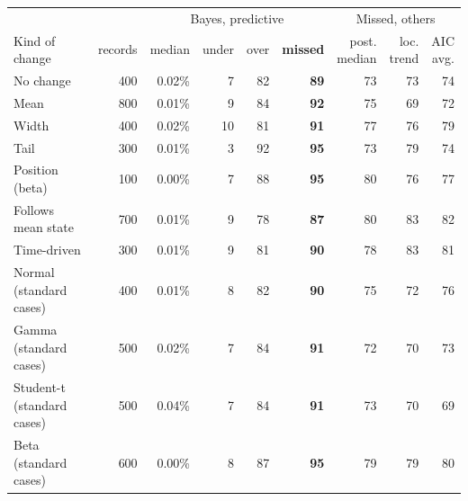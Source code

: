 \begin{tabular}{l r rrr r rrr}
\toprule
 & & \multicolumn{4}{c}{Bayes, predictive} & \multicolumn{3}{c}{Missed, others} \\
\cmidrule(lr){3-6}\cmidrule(lr){7-9}
Kind of change & records & median & under & over & \textbf{missed} & \shortstack{post.\\median} & \shortstack{loc.\\trend} & \shortstack{AIC\\avg.} \\
\midrule
No change & 400 & 0.02\% & 7 & 82 & \textbf{89} & 73 & 73 & 74 \\
Mean & 800 & 0.01\% & 9 & 84 & \textbf{92} & 75 & 69 & 72 \\
Width & 400 & 0.02\% & 10 & 81 & \textbf{91} & 77 & 76 & 79 \\
Tail & 300 & 0.01\% & 3 & 92 & \textbf{95} & 73 & 79 & 74 \\
Position (beta) & 100 & 0.00\% & 7 & 88 & \textbf{95} & 80 & 76 & 77 \\
Follows mean state & 700 & 0.01\% & 9 & 78 & \textbf{87} & 80 & 83 & 82 \\
Time-driven & 300 & 0.01\% & 9 & 81 & \textbf{90} & 78 & 83 & 81 \\
\midrule
Normal (standard cases) & 400 & 0.01\% & 8 & 82 & \textbf{90} & 75 & 72 & 76 \\
Gamma (standard cases) & 500 & 0.02\% & 7 & 84 & \textbf{91} & 72 & 70 & 73 \\
Student-t (standard cases) & 500 & 0.04\% & 7 & 84 & \textbf{91} & 73 & 70 & 69 \\
Beta (standard cases) & 600 & 0.00\% & 8 & 87 & \textbf{95} & 79 & 79 & 80 \\
\bottomrule
\end{tabular}
